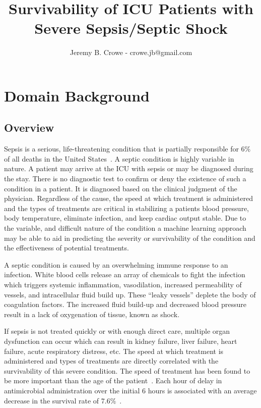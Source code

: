 \documentclass[11pt]{article}
\begin{document}
	
	\title{Survivability of ICU Patients with Severe Sepsis/Septic Shock}
	\author{Jeremy B. Crowe - crowe.jb@gmail.com}
	\maketitle
	
	\section{Domain Background}
	\subsection{Overview}
	Sepsis is a serious, life-threatening condition that is partially responsible for 6\%  of all deaths in the United States~\cite{cdc}. A septic condition is highly variable in nature. A patient may arrive at the ICU with sepsis or may be diagnosed during the stay. There is no diagnostic test to confirm or deny the existence of such a condition in a patient. It is diagnosed based on the clinical judgment of the physician. Regardless of the cause, the speed at which treatment is administered and the types of treatments are critical in stabilizing a patients blood pressure, body temperature, eliminate infection, and keep cardiac output stable. Due to the variable, and difficult nature of the condition a machine learning approach may be able to aid in predicting the severity or survivability of the condition and the effectiveness of potential treatments.
	
	A septic condition is caused by an overwhelming immune response to an infection. White blood cells release an array of chemicals to fight the infection which triggers systemic inflammation, vasodilation, increased permeability of vessels, and intracellular fluid build up. These ``leaky vessels'' deplete the body of coagulation factors. The increased fluid build-up and decreased blood pressure result in a lack of oxygenation of tissue, known as shock.
	
	If sepsis is not treated quickly or with enough direct care, multiple organ dysfunction can occur which can result in kidney failure, liver failure, heart failure, acute respiratory distress, etc. The speed at which treatment is administered and types of treatments are directly correlated with the survivability of this severe condition. The speed of treatment has been found to be more important than the age of the patient~\cite{survival2}. Each hour of delay in antimicrobial administration over the initial 6 hours is associated with an average decrease in the survival rate of 7.6\%~\cite{survival}.
	
\end{document}
